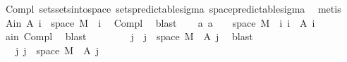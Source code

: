 \begin{isabellebody}
\ Compl{\isacharparenleft}{\kern0pt}{}{\isacharparenright}{\kern0pt}\ sets{\isachardot}{\kern0pt}sets{\isacharunderscore}{\kern0pt}into{\isacharunderscore}{\kern0pt}space\ sets{\isacharunderscore}{\kern0pt}predictable{\isacharunderscore}{\kern0pt}sigma\ space{\isacharunderscore}{\kern0pt}predictable{\isacharunderscore}{\kern0pt}sigma\ \isamarkupfalse%
\ metis\isanewline
\ \ \isamarkupfalse%
\ A{\isacharunderscore}{\kern0pt}in{\isacharcolon}{\kern0pt}\ {\isachardoublequoteopen}A\ i\ {\isasymsubseteq}\ space\ M{\isachardoublequoteclose}\ \ i\ \isamarkupfalse%
\ Compl{\isacharparenleft}{\kern0pt}{}{\isacharparenright}{\kern0pt}\ \isamarkupfalse%
\ blast\isanewline
\ \ \isamarkupfalse%
\ a{\isacharcolon}{\kern0pt}\ {\isachardoublequoteopen}a\ {\isacharequal}{\kern0pt}\ {\isacharbraceleft}{\kern0pt}{}{\isachardot}{\kern0pt}{\isachardot}{\kern0pt}{\isacharbraceright}{\kern0pt}\ {\isasymtimes}\ space\ M\ {\isacharminus}{\kern0pt}\ {\isacharparenleft}{\kern0pt}{\isasymUnion}i{\isachardot}{\kern0pt}\ {\isacharbraceleft}{\kern0pt}i{\isacharbraceright}{\kern0pt}\ {\isasymtimes}\ A\ i{\isacharparenright}{\kern0pt}{\isachardoublequoteclose}\ \isamarkupfalse%
\ a{\isacharunderscore}{\kern0pt}in\ Compl{\isacharparenleft}{\kern0pt}{}{\isacharparenright}{\kern0pt}\ \isamarkupfalse%
\ blast\isanewline
\ \ \isamarkupfalse%
\ \isamarkupfalse%
\ {\isachardoublequoteopen}{\isachardot}{\kern0pt}{\isachardot}{\kern0pt}{\isachardot}{\kern0pt}\ {\isacharequal}{\kern0pt}\ {\isacharminus}{\kern0pt}\ {\isacharparenleft}{\kern0pt}{\isasymInter}j{\isachardot}{\kern0pt}\ {\isacharminus}{\kern0pt}\ {\isacharparenleft}{\kern0pt}{\isacharbraceleft}{\kern0pt}j{\isacharbraceright}{\kern0pt}\ {\isasymtimes}\ {\isacharparenleft}{\kern0pt}space\ M\ {\isacharminus}{\kern0pt}\ A\ j{\isacharparenright}{\kern0pt}{\isacharparenright}{\kern0pt}{\isacharparenright}{\kern0pt}{\isachardoublequoteclose}\ \isamarkupfalse%
\ blast\isanewline
\ \ \isamarkupfalse%
\ \isamarkupfalse%
\ {\isachardoublequoteopen}{\isachardot}{\kern0pt}{\isachardot}{\kern0pt}{\isachardot}{\kern0pt}\ {\isacharequal}{\kern0pt}\ {\isacharparenleft}{\kern0pt}{\isasymUnion}j{\isachardot}{\kern0pt}\ {\isacharbraceleft}{\kern0pt}j{\isacharbraceright}{\kern0pt}\ {\isasymtimes}\ {\isacharparenleft}{\kern0pt}space\ M\ {\isacharminus}{\kern0pt}\ A\ j{\isacharparenright}{\kern0pt}{\isacharparenright}{\kern0pt}{\isachardoublequoteclose}\ \isamarkupfalse%

\end{isabellebody}
